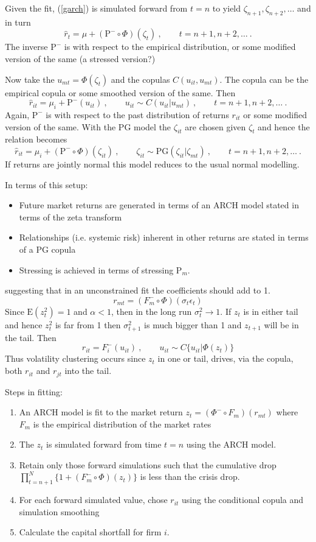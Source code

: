 \documentclass[authoryear]{elsarticle}
\newcommand{\E}{\mathrm{E}}
\newcommand{\eps}{\epsilon}
\newcommand{\bi}{\begin{itemize}}
\newcommand{\ei}{\end{itemize}}
\renewcommand{\i}{\item}
\newcommand{\eref}[1]{(\ref{#1})}
\newcommand{\cq}{\ , \qquad}
\renewcommand{\P}{\mathrm{P}}
\newcommand{\be}[1]{\begin{equation}\label{#1}}
\newcommand{\ee}{\end{equation}}
\begin{document}
Given the fit, \eref{garch} is simulated forward from $t=n$ to yield $\zeta_{n+1},\zeta_{n+2},\ldots$ and in turn
$$
\hat r_{t}=\mu+(\P^-\circ \Phi)(\zeta_{t})\cq t=n+1,n+2,\ldots\ .
$$
The inverse $\P^-$ is  with respect to the empirical distribution, or some modified version of the same  (a stressed version?)

Now take the $u_{mt} = \Phi(\zeta_t)$ and the copulas $C(u_{it},u_{mt})$.   The copula can be the empirical copula or some smoothed version of the same.   Then 
$$
\hat r_{it} = \mu_i + \P^-(u_{it})\cq u_{it}\sim C(u_{it}|u_{mt}) \cq t=n+1,n+2,\ldots\ .
$$
Again, $\P^-$ is with respect to the past distribution of returns $r_{it}$ or some modified version of the same.  With the PG model the $\zeta_{it}$ are chosen given $\zeta_t$ and hence the relation becomes
$$
\hat r_{it} = \mu_i + (\P^-\circ\Phi)(\zeta_{it})\cq \zeta_{it}\sim \mathrm{PG}(\zeta_{it}|\zeta_{mt}) \cq t=n+1,n+2,\ldots\ .
$$
If returns are jointly normal this model reduces to the usual normal modelling.

In terms of this setup:
\bi
\i Future market returns are generated in terms of an ARCH model stated in terms of the zeta transform
\i Relationships (i.e. systemic risk) inherent in other returns are stated in terms of a PG copula
\i Stressing is achieved in terms of stressing $\P_m$.
\ei

suggesting that in an unconstrained fit the coefficients should add to 1.
$$
r_{mt}=(F_m^-\circ\Phi)(\sigma_t\eps_t)
$$
Since $\E(z_t^2)=1$ and $\alpha<1$, then in the long run $\sigma^2_t\rightarrow 1$.   If $z_t$ is in either tail and hence $z_t^2$ is far from  1 then $\sigma^2_{t+1}$ is much bigger than 1 and $z_{t+1}$ will be in the tail.   Then
\be{forward}
r_{it}=F_i^-(u_{it})\cq u_{it}\sim C\{u_{it}|\Phi(z_t)\}
\ee
Thus volatility clustering occurs since $z_t$ in one or tail, drives, via the copula, both $r_{it}$ and $r_{jt}$ into the tail.      

Steps in fitting:
\begin{enumerate}
\i  An ARCH model is fit to the market return $z_t=(\Phi^-\circ F_m)(r_{mt})$ where $F_m$ is the empirical distribution of the market rates
\i  The $z_t$ is simulated forward from time $t=n$ using the ARCH model. 
\i  Retain only those forward simulations such that the cumulative drop $\prod_{t=n+1}^N\{1+(F_m^-\circ \Phi)(z_t)\}$ is less than the crisis drop.
\i  For each forward simulated value, chose $r_{it}$ using the conditional copula and simulation smoothing
\i Calculate the capital shortfall for firm $i$.
\end{enumerate}
\end{document}
